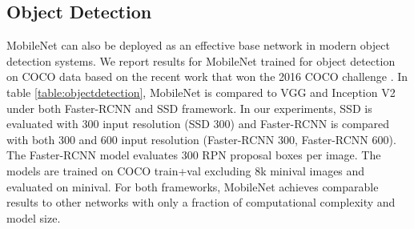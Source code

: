 \documentclass[10pt,twocolumn,letterpaper]{article}
\begin{document}
\subsection{Object Detection}

MobileNet can also be deployed as an effective base network in modern object detection systems.
We report results for MobileNet trained for object detection on COCO data based on the recent work that won the 2016 COCO challenge \cite{cocodetection2016}.
In table \ref{table:objectdetection}, MobileNet is compared to VGG and Inception V2 \cite{ioffe2015batch} under both Faster-RCNN \cite{ren2015faster} and SSD \cite{liu2015ssd} framework.
In our experiments, SSD is evaluated with 300 input resolution (SSD 300) and Faster-RCNN is compared with both 300 and 600 input resolution (Faster-RCNN 300, Faster-RCNN 600).
The Faster-RCNN model evaluates 300 RPN proposal boxes per image. The models are trained on COCO train+val excluding 8k minival images and evaluated on minival.
For both frameworks, MobileNet achieves comparable results to other networks with only a fraction of computational complexity and model size.

\begin{table}[t]
\setlength\tabcolsep{3pt}
  \caption{COCO object detection results comparison using different frameworks and network architectures. mAP is reported with COCO primary challenge metric (AP at IoU=0.50:0.05:0.95)} %
\centering %
\label{table:objectdetection} %
\end{table}
\end{document}
